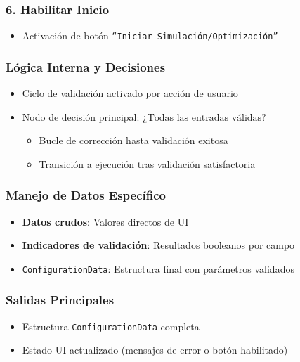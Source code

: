 \subsubsection*{6. Habilitar Inicio}
\begin{itemize}
    \item Activación de botón \texttt{``Iniciar Simulación/Optimización''}
\end{itemize}

\subsubsection{Lógica Interna y Decisiones}
\begin{itemize}
    \item Ciclo de validación activado por acción de usuario
    \item Nodo de decisión principal: $\text{¿Todas las entradas válidas?}$
    \begin{itemize}
        \item Bucle de corrección hasta validación exitosa
        \item Transición a ejecución tras validación satisfactoria
    \end{itemize}
\end{itemize}

\subsubsection{Manejo de Datos Específico}
\begin{itemize}
    \item \textbf{Datos crudos}: Valores directos de UI
    \item \textbf{Indicadores de validación}: Resultados booleanos por campo
    \item \texttt{ConfigurationData}: Estructura final con parámetros validados
\end{itemize}

\subsubsection{Salidas Principales}
\begin{itemize}
    \item Estructura \texttt{ConfigurationData} completa
    \item Estado UI actualizado (mensajes de error o botón habilitado)
\end{itemize}

